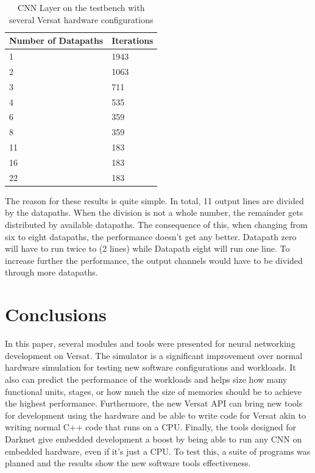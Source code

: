 \documentclass[conference]{IEEEtran}
\begin{document}
\begin{table}[!htpb]
    \centering
    \begin{tabular}{ll}
    \hline
    \textbf{Number of Datapaths} &  \textbf{Iterations}        \\ \hline
    1          & 1943                 \\
	2          & 1063                 \\
	3          & 711                 \\
	4          & 535                 \\
	6          & 359                 \\
	8          & 359                 \\
	11          & 183                 \\
	16          & 183                 \\
    22            & 183                       \\  \hline
    \end{tabular}
    \label{table:Iterations}
    \linebreak
    \caption{CNN Layer on the testbench with several Versat hardware configurations}
\end{table}

The reason for these results is quite simple. In total, 11 output lines are divided
by the datapaths. When the division is not a whole number, the remainder gets distributed
by available datapaths. The consequence of this, when changing from six to eight datapaths, the performance
doesn't get any better. Datapath zero will have to run twice to (2 lines) while Datapath eight will run one line.
To increase further the performance, the output channels would have to be divided through more datapaths.





\section{Conclusions}
\label{chapter:conclusions}

In this paper, several modules and tools were presented for neural networking development on Versat.
The simulator is a significant improvement over normal hardware simulation for testing new
software configurations and workloads. It also can predict the performance of the workloads
and helps size how many functional units, stages, or how much the size of memories should be
to achieve the highest performance.
Furthermore, the new Versat API can bring new tools for development using the hardware
and be able to write code for Versat akin to writing normal C++ code that runs on a CPU.
Finally, the tools designed for Darknet give embedded development a boost by being able to
run any CNN on embedded hardware, even if it's just a CPU.
To test this, a suite of programs was planned and the results show the new software tools
effectiveness.
\end{document}
